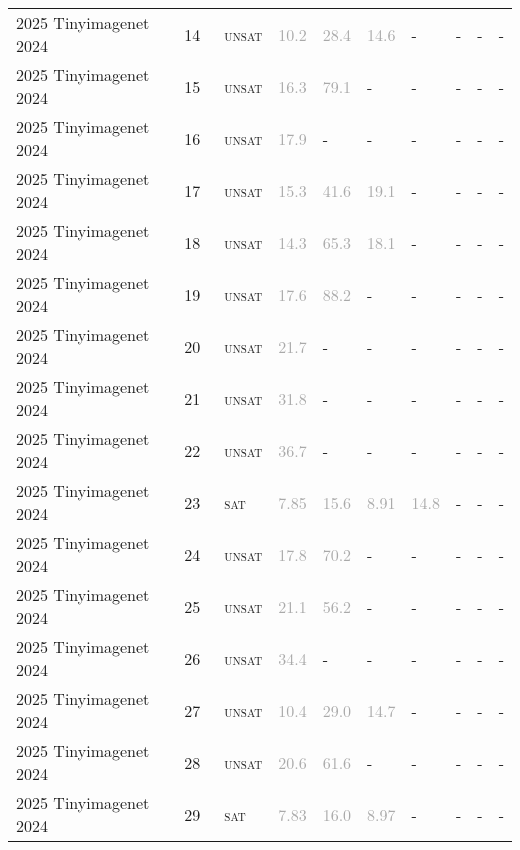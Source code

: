 \begin{center}
{\begin{longtable}{@{}llllllllll@{}}
2025 Tinyimagenet 2024 & 14 & ~\textsc{unsat} & \textcolor{darkgray}{10.2} & \textcolor{darkgray}{28.4} & \textcolor{darkgray}{14.6} & - & - & - & - \\
2025 Tinyimagenet 2024 & 15 & ~\textsc{unsat} & \textcolor{darkgray}{16.3} & \textcolor{darkgray}{79.1} & - & - & - & - & - \\
2025 Tinyimagenet 2024 & 16 & ~\textsc{unsat} & \textcolor{darkgray}{17.9} & - & - & - & - & - & - \\
2025 Tinyimagenet 2024 & 17 & ~\textsc{unsat} & \textcolor{darkgray}{15.3} & \textcolor{darkgray}{41.6} & \textcolor{darkgray}{19.1} & - & - & - & - \\
2025 Tinyimagenet 2024 & 18 & ~\textsc{unsat} & \textcolor{darkgray}{14.3} & \textcolor{darkgray}{65.3} & \textcolor{darkgray}{18.1} & - & - & - & - \\
2025 Tinyimagenet 2024 & 19 & ~\textsc{unsat} & \textcolor{darkgray}{17.6} & \textcolor{darkgray}{88.2} & - & - & - & - & - \\
2025 Tinyimagenet 2024 & 20 & ~\textsc{unsat} & \textcolor{darkgray}{21.7} & - & - & - & - & - & - \\
2025 Tinyimagenet 2024 & 21 & ~\textsc{unsat} & \textcolor{darkgray}{31.8} & - & - & - & - & - & - \\
2025 Tinyimagenet 2024 & 22 & ~\textsc{unsat} & \textcolor{darkgray}{36.7} & - & - & - & - & - & - \\
2025 Tinyimagenet 2024 & 23 & ~\textsc{sat} & \textcolor{darkgray}{7.85} & \textcolor{darkgray}{15.6} & \textcolor{darkgray}{8.91} & \textcolor{darkgray}{14.8} & - & - & - \\
2025 Tinyimagenet 2024 & 24 & ~\textsc{unsat} & \textcolor{darkgray}{17.8} & \textcolor{darkgray}{70.2} & - & - & - & - & - \\
2025 Tinyimagenet 2024 & 25 & ~\textsc{unsat} & \textcolor{darkgray}{21.1} & \textcolor{darkgray}{56.2} & - & - & - & - & - \\
2025 Tinyimagenet 2024 & 26 & ~\textsc{unsat} & \textcolor{darkgray}{34.4} & - & - & - & - & - & - \\
2025 Tinyimagenet 2024 & 27 & ~\textsc{unsat} & \textcolor{darkgray}{10.4} & \textcolor{darkgray}{29.0} & \textcolor{darkgray}{14.7} & - & - & - & - \\
2025 Tinyimagenet 2024 & 28 & ~\textsc{unsat} & \textcolor{darkgray}{20.6} & \textcolor{darkgray}{61.6} & - & - & - & - & - \\
2025 Tinyimagenet 2024 & 29 & ~\textsc{sat} & \textcolor{darkgray}{7.83} & \textcolor{darkgray}{16.0} & \textcolor{darkgray}{8.97} & - & - & - & - \\

\end{longtable}}
\end{center}

